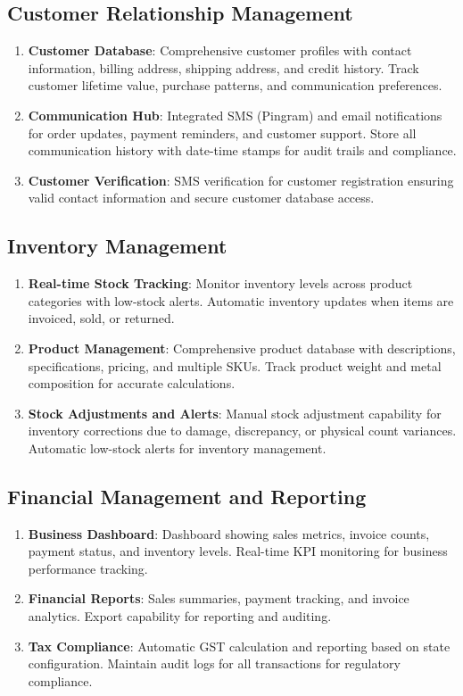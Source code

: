 \documentclass[12pt,a4paper]{report}
\begin{document}
\subsection{Customer Relationship Management}
\begin{enumerate}[label=\roman*)]
    \item \textbf{Customer Database}: Comprehensive customer profiles with contact information, billing address, shipping address, and credit history. Track customer lifetime value, purchase patterns, and communication preferences.
    \item \textbf{Communication Hub}: Integrated SMS (Pingram) and email notifications for order updates, payment reminders, and customer support. Store all communication history with date-time stamps for audit trails and compliance.
    \item \textbf{Customer Verification}: SMS verification for customer registration ensuring valid contact information and secure customer database access.
\end{enumerate}

\subsection{Inventory Management}
\begin{enumerate}[label=\roman*)]
    \item \textbf{Real-time Stock Tracking}: Monitor inventory levels across product categories with low-stock alerts. Automatic inventory updates when items are invoiced, sold, or returned.
    \item \textbf{Product Management}: Comprehensive product database with descriptions, specifications, pricing, and multiple SKUs. Track product weight and metal composition for accurate calculations.
    \item \textbf{Stock Adjustments and Alerts}: Manual stock adjustment capability for inventory corrections due to damage, discrepancy, or physical count variances. Automatic low-stock alerts for inventory management.
\end{enumerate}

\subsection{Financial Management and Reporting}
\begin{enumerate}[label=\roman*)]
    \item \textbf{Business Dashboard}: Dashboard showing sales metrics, invoice counts, payment status, and inventory levels. Real-time KPI monitoring for business performance tracking.
    \item \textbf{Financial Reports}: Sales summaries, payment tracking, and invoice analytics. Export capability for reporting and auditing.
    \item \textbf{Tax Compliance}: Automatic GST calculation and reporting based on state configuration. Maintain audit logs for all transactions for regulatory compliance.
\end{enumerate}
\end{document}
